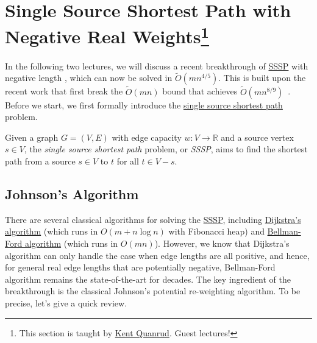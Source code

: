 \section[Single Source Shortest Path with Negative Real Weights]{Single Source Shortest Path with Negative Real Weights\protect\footnote{This section is taught by \href{https://kentquanrud.com/}{Kent Quanrud}. Guest lectures!}}
In the following two lectures, we will discuss a recent breakthrough of \hyperref[prb:SSSP]{SSSP} with negative length \cite{huang2024fastersinglesourceshortestpaths}, which can now be solved in \(\widetilde{O} (mn^{4 / 5})\). This is built upon the recent work that first break the \(\widetilde{O} (mn)\) bound that achieves \(\widetilde{O} (mn^{8 / 9})\)~\cite{fineman2024single}. Before we start, we first formally introduce the \hyperref[prb:SSSP]{single source shortest path} problem.

\begin{problem}\label{prb:SSSP}
Given a graph \(G = (V, E)\) with edge capacity \(w\colon V \to \mathbb{R} \) and a source vertex \(s \in V\), the \emph{single source shortest path} problem, or \emph{SSSP}, aims to find the shortest path from a source \(s \in V\) to \(t\) for all \(t \in V - s\).
\end{problem}

\subsection{Johnson's Algorithm}
There are several classical algorithms for solving the \hyperref[prb:SSSP]{SSSP}, including \href{https://en.wikipedia.org/wiki/Dijkstra%27s_algorithm}{Dijkstra's algorithm} (which runs in \(O(m + n \log n)\) with Fibonacci heap) and \href{https://en.wikipedia.org/wiki/Bellman%E2%80%93Ford_algorithm}{Bellman-Ford algorithm} (which runs in \(O(mn)\)). However, we know that Dijkstra's algorithm can only handle the case when edge lengths are all positive, and hence, for general real edge lengths that are potentially negative, Bellman-Ford algorithm remains the state-of-the-art for decades. The key ingredient of the breakthrough is the classical Johnson's potential re-weighting algorithm. To be precise, let's give a quick review.

